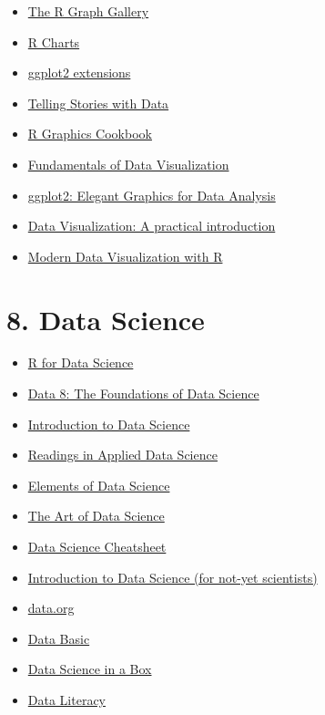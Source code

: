 \documentclass[
  letterpaper,
  DIV=11,
  numbers=noendperiod]{scrreprt}
\providecommand{\tightlist}{%
  \setlength{\itemsep}{0pt}\setlength{\parskip}{0pt}}\usepackage{longtable,booktabs,array}
\begin{document}
\begin{itemize}
\tightlist
\item
  \href{https://r-graph-gallery.com/}{The R Graph Gallery}
\item
  \href{https://r-charts.com/}{R Charts}
\item
  \href{https://exts.ggplot2.tidyverse.org/}{ggplot2 extensions}
\item
  \href{https://tellingstorieswithdata.com/}{Telling Stories with Data}
\item
  \href{https://r-graphics.org/}{R Graphics Cookbook}
\item
  \href{https://clauswilke.com/dataviz/}{Fundamentals of Data
  Visualization}
\item
  \href{https://ggplot2-book.org/}{ggplot2: Elegant Graphics for Data
  Analysis}
\item
  \href{https://socviz.co/}{Data Visualization: A practical
  introduction}
\item
  \href{https://rkabacoff.github.io/datavis/}{Modern Data Visualization
  with R}
\end{itemize}

\hypertarget{data-science}{%
\section*{8. Data Science}\label{data-science}}


\begin{itemize}
\tightlist
\item
  \href{https://r4ds.hadley.nz/}{R for Data Science}
\item
  \href{https://www.data8.org/}{Data 8: The Foundations of Data Science}
\item
  \href{https://sml201.github.io/}{Introduction to Data Science}
\item
  \href{https://github.com/hadley/stats337}{Readings in Applied Data
  Science}
\item
  \href{https://github.com/AllenDowney/ElementsOfDataScience}{Elements
  of Data Science}
\item
  \href{https://bookdown.org/rdpeng/artofdatascience/}{The Art of Data
  Science}
\item
  \href{https://github.com/ml874/Data-Science-Cheatsheet}{Data Science
  Cheatsheet}
\item
  \href{https://florian-huber.github.io/data_science_course/book/cover.html}{Introduction
  to Data Science (for not-yet scientists)}
\item
  \href{https://data.org/}{data.org}
\item
  \href{https://databasic.io/en/}{Data Basic}
\item
  \href{https://datasciencebox.org/}{Data Science in a Box}
\item
  \href{http://dataliteracy.rbind.io/}{Data Literacy}
\end{itemize}
\end{document}
